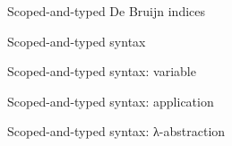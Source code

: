 \documentclass{beamer}
\begin{document}
\begin{frame}{Scoped-and-typed De Bruijn indices}

\end{frame}

\begin{frame}{Scoped-and-typed syntax}
\end{frame}

\begin{frame}{Scoped-and-typed syntax: variable}
  \begin{minipage}[t]{.45\textwidth}
  \end{minipage}\hfill
  \begin{minipage}[t]{.45\textwidth}
  \begin{mathpar}
  \end{mathpar}
  \end{minipage}
\end{frame}

\begin{frame}{Scoped-and-typed syntax: application}
  \begin{minipage}[t]{.45\textwidth}
  \end{minipage}\hfill
  \begin{minipage}[t]{.45\textwidth}
  \begin{mathpar}
  \end{mathpar}
  \end{minipage}
\end{frame}


\begin{frame}{Scoped-and-typed syntax: λ-abstraction}
  \begin{minipage}[t]{.45\textwidth}
  \end{minipage}\hfill
  \begin{minipage}[t]{.45\textwidth}
  \begin{mathpar}
  \end{mathpar}
  \end{minipage}
\end{frame}
\end{document}

